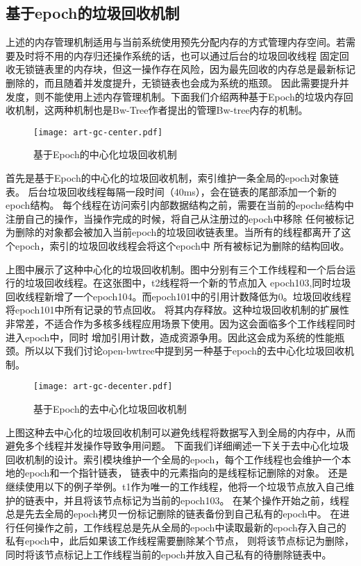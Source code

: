 \subsection{基于epoch的垃圾回收机制}

上述的内存管理机制适用与当前系统使用预先分配内存的方式管理内存空间。若需要及时将不用的内存归还操作系统的话，也可以通过后台的垃圾回收线程
固定回收无锁链表里的内存块，但这一操作存在风险，因为最先回收的内存总是最新标记删除的，而且随着并发度提升，无锁链表也会成为系统的瓶颈。
因此需要提升并发度，则不能使用上述内存管理机制。下面我们介绍两种基于Epoch的垃圾内存回收机制，这两种机制也是Bw-Tree作者提出的管理Bw-tree内存的机制。

\begin{figure}[h]
  \centering
  \texttt{[image: art-gc-center.pdf]}
  \caption{基于Epoch的中心化垃圾回收机制}
  \label{fig:art-gc-center}
\end{figure}

首先是基于Epoch的中心化的垃圾回收机制，索引维护一条全局的epoch对象链表。
后台垃圾回收线程每隔一段时间（40ms），会在链表的尾部添加一个新的epoch结构。
每个线程在访问索引内部数据结构之前，需要在当前的epoche结构中注册自己的操作，当操作完成的时候，将自己从注册过的epoch中移除
任何被标记为删除的对象都会被加入当前epoch的垃圾回收链表里。当所有的线程都离开了这个epoch，索引的垃圾回收线程会将这个epoch中
所有被标记为删除的结构回收。

上图中展示了这种中心化的垃圾回收机制。图中分别有三个工作线程和一个后台运行的垃圾回收线程。在这张图中，t2线程将一个新的节点加入
epoch103,同时垃圾回收线程新增了一个epoch104。而epoch101中的引用计数降低为0。垃圾回收线程将epoch101中所有记录的节点回收。
将其内存释放。这种垃圾回收机制的扩展性非常差，不适合作为多核多线程应用场景下使用。因为这会面临多个工作线程同时进入epoch中，同时
增加引用计数，造成资源争用。因此这会成为系统的性能瓶颈。所以以下我们讨论open-bwtree中提到另一种基于epoch的去中心化垃圾回收机制。

\begin{figure}[h]
  \centering
  \texttt{[image: art-gc-decenter.pdf]}
  \caption{基于Epoch的去中心化垃圾回收机制}
  \label{fig:art-gc-decenter}
\end{figure}


上图这种去中心化的垃圾回收机制可以避免线程将数据写入到全局的内存中，从而避免多个线程并发操作导致争用问题。
下面我们详细阐述一下关于去中心化垃圾回收机制的设计。索引模块维护一个全局的epoch，每个工作线程也会维护一个本地的epoch和一个指针链表，
链表中的元素指向的是线程标记删除的对象。
还是继续使用以下的例子举例。t1作为唯一的工作线程，他将一个垃圾节点放入自己维护的链表中，并且将该节点标记为当前的epoch103。
在某个操作开始之前，线程总是先去全局的epoch拷贝一份标记删除的链表备份到自己私有的epoch中。
在进行任何操作之前，工作线程总是先从全局的epoch中读取最新的epoch存入自己的私有epoch中，此后如果该工作线程需要删除某个节点，
则将该节点标记为删除，同时将该节点标记上工作线程当前的epoch并放入自己私有的待删除链表中。

